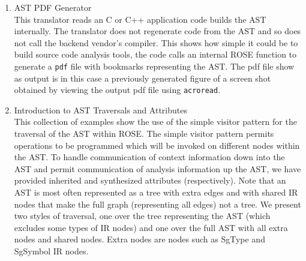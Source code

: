 \begin{itemize}
\begin{enumerate}
     \item AST PDF Generator \\
           This translator reads an C or C++ application code builds the AST internally.
           The translator does not regenerate code from the AST and so does not
           call the backend vendor's compiler. This shows how simple it could be
           to build source code analysis tools, the code calls an internal ROSE function
           to generate a {\tt pdf} file with bookmarks representing the AST.  The 
           pdf file show as output is in this case a previously generated figure of a
           screen shot obtained by viewing the output pdf file using {\tt acroread}.


     \item Introduction to AST Traversals and Attributes \\
           This collection of examples show the use of the simple visitor pattern for 
           the traversal of the AST within ROSE.  The simple visitor pattern permits
           operations to be programmed which will be invoked on different nodes 
           within the AST.  To handle communication of context information down into the
           AST and permit communication of analysis information up the AST, we have 
           provided inherited and synthesized attributes (respectively). Note that
           an AST is most often represented as a tree with extra edges and with shared IR
           nodes that make the full graph (representing all edges) not a tree.  We present
           two styles of traversal, one over the tree representing the AST (which
           excludes some types of IR nodes) and one over the full AST with all extra
           nodes and shared nodes.  Extra nodes are nodes such as SgType and SgSymbol 
           IR nodes.



\end{enumerate}
\end{itemize}
